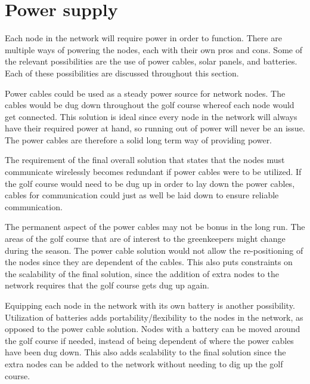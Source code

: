 \section{Power supply}
%


Each node in the network will require power in order to function. There are multiple ways of powering the nodes, each with their own pros and cons. Some of the relevant possibilities are the use of power cables, solar panels, and batteries. Each of these possibilities are discussed throughout this section.


Power cables could be used as a steady power source for network nodes. The cables would be dug down throughout the golf course whereof each node would get connected. This solution is ideal since every node in the network will always have their required power at hand, so running out of power will never be an issue. The power cables are therefore a solid long term way of providing power.

The requirement of the final overall solution that states that the nodes must communicate wirelessly becomes redundant if power cables were to be utilized. If the golf course would need to be dug up in order to lay down the power cables, cables for communication could just as well be laid down to ensure reliable communication.

The permanent aspect of the power cables may not be bonus in the long run. The areas of the golf course that are of interest to the greenkeepers might change during the season. The power cable solution would not allow the re-positioning of the nodes since they are dependent of the cables. This also puts constraints on the scalability of the final solution, since the addition of extra nodes to the network requires that the golf course gets dug up again.

Equipping each node in the network with its own battery is another possibility. Utilization of batteries adds portability/flexibility to the nodes in the network, as opposed to the power cable solution. Nodes with a battery can be moved around the golf course if needed, instead of being dependent of where the power cables have been dug down. This also adds scalability to the final solution since the extra nodes can be added to the network without needing to dig up the golf course.

